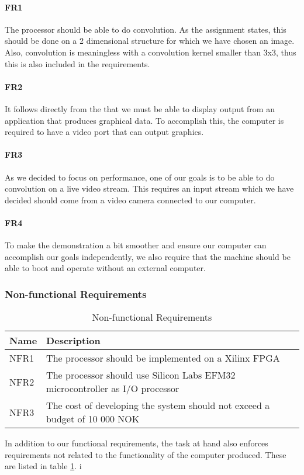 \paragraph{FR1}
The processor should be able to do convolution.
As the assignment states, this should be done on a 2 dimensional structure for which we have chosen an image.
Also, convolution is meaningless with a convolution kernel smaller than 3x3, thus this is also included in the requirements.

\paragraph{FR2}
It follows directly from the  that we must be able to display output from an application that produces graphical data.
To accomplish this, the computer is required to have a video port that can output graphics.

\paragraph{FR3}
As we decided to focus on performance, one of our goals is to be able to do convolution on a live video stream.
This requires an input stream which we have decided should come from a video camera connected to our computer.

\paragraph{FR4}
To make the demonstration a bit smoother and ensure our computer can accomplish our goals independently, we also require that the machine should be able to boot and operate without an external computer.


\subsubsection{Non-functional Requirements}

\begin{table}[h]
    \centering
    \begin{tabular}{lp{12cm}l}
        Name & Description \\
        \hline
        NFR1 &
            The processor should be implemented on a Xilinx FPGA \\
        NFR2 &
            The processor should use Silicon Labs EFM32 microcontroller as I/O processor \\
        NFR3 &
            The cost of developing the system should not exceed a budget of 10 000 NOK \\
    \end{tabular}
    \caption{Non-functional Requirements}
    \label{tab:NonFunctionalRequirements}
\end{table}

In addition to our functional requirements, the task at hand also enforces requirements not related to the functionality of the computer produced. These are listed in table \ref{tab:NonFunctionalRequirements}.
i
